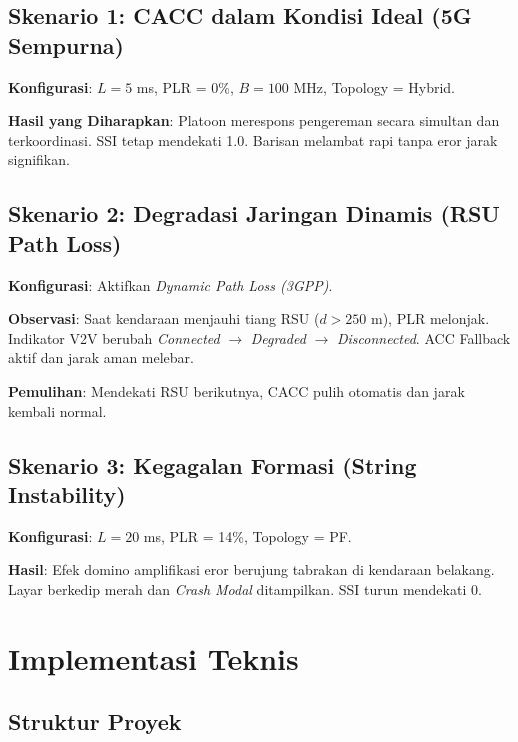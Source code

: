 \documentclass[12pt,a4paper]{article}
\begin{document}
\subsection{Skenario 1: CACC dalam Kondisi Ideal (5G Sempurna)}

\textbf{Konfigurasi}: $L = 5$ ms, PLR = 0\%, $B = 100$ MHz, Topology = Hybrid.

\textbf{Hasil yang Diharapkan}: Platoon merespons pengereman secara simultan dan
terkoordinasi. SSI tetap mendekati 1.0. Barisan melambat rapi tanpa eror jarak signifikan.

\subsection{Skenario 2: Degradasi Jaringan Dinamis (RSU Path Loss)}

\textbf{Konfigurasi}: Aktifkan \textit{Dynamic Path Loss (3GPP)}.

\textbf{Observasi}: Saat kendaraan menjauhi tiang RSU ($d > 250$ m), PLR melonjak.
Indikator V2V berubah \textit{Connected} $\to$ \textit{Degraded} $\to$
\textit{Disconnected}. ACC Fallback aktif dan jarak aman melebar.

\textbf{Pemulihan}: Mendekati RSU berikutnya, CACC pulih otomatis dan jarak kembali normal.

\subsection{Skenario 3: Kegagalan Formasi (String Instability)}

\textbf{Konfigurasi}: $L = 20$ ms, PLR = 14\%, Topology = PF.

\textbf{Hasil}: Efek domino amplifikasi eror berujung tabrakan di kendaraan belakang.
Layar berkedip merah dan \textit{Crash Modal} ditampilkan. SSI turun mendekati 0.

\section{Implementasi Teknis}

\subsection{Struktur Proyek}
\end{document}
